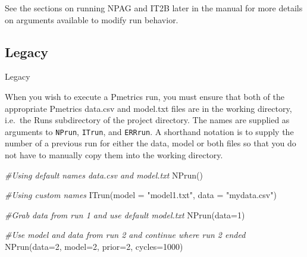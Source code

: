 \documentclass[
]{book}
\newenvironment{Shaded}{\begin{snugshade}}{\end{snugshade}}
\newcommand{\AttributeTok}[1]{\textcolor[rgb]{0.77,0.63,0.00}{#1}}
\newcommand{\CommentTok}[1]{\textcolor[rgb]{0.56,0.35,0.01}{\textit{#1}}}
\newcommand{\DecValTok}[1]{\textcolor[rgb]{0.00,0.00,0.81}{#1}}
\newcommand{\FunctionTok}[1]{\textcolor[rgb]{0.00,0.00,0.00}{#1}}
\newcommand{\NormalTok}[1]{#1}
\newcommand{\SpecialCharTok}[1]{\textcolor[rgb]{0.00,0.00,0.00}{#1}}
\newcommand{\StringTok}[1]{\textcolor[rgb]{0.31,0.60,0.02}{#1}}
\begin{document}
\begin{Shaded}
\end{Shaded}

See the sections on running NPAG and IT2B later in the manual for more details on arguments available to modify run behavior.

\hypertarget{legacy}{%
\subsection{Legacy}\label{legacy}}

{Legacy}

When you wish to execute a Pmetrics run, you must ensure that
both of the appropriate Pmetrics data.csv and model.txt files are in the working
directory, i.e.~the Runs subdirectory of the project directory. The names are supplied as arguments to \texttt{NPrun}, \texttt{ITrun}, and \texttt{ERRrun}. A shorthand notation is to supply the number of a previous run for either the data, model or both files so that you do not have to manually copy them into the working directory.

\begin{Shaded}
\begin{Highlighting}[]
\CommentTok{\#Using default names data.csv and model.txt}
\FunctionTok{NPrun}\NormalTok{()}

\CommentTok{\#Using custom names}
\FunctionTok{ITrun}\NormalTok{(}\AttributeTok{model =} \StringTok{"model1.txt"}\NormalTok{, }\AttributeTok{data =} \StringTok{"mydata.csv"}\NormalTok{)}

\CommentTok{\#Grab data from run 1 and use default model.txt}
\FunctionTok{NPrun}\NormalTok{(}\AttributeTok{data=}\DecValTok{1}\NormalTok{)}

\CommentTok{\#Use model and data from run 2 and continue where run 2 ended}
\FunctionTok{NPrun}\NormalTok{(}\AttributeTok{data=}\DecValTok{2}\NormalTok{, }\AttributeTok{model=}\DecValTok{2}\NormalTok{, }\AttributeTok{prior=}\DecValTok{2}\NormalTok{, }\AttributeTok{cycles=}\DecValTok{1000}\NormalTok{)}
\end{Highlighting}
\end{Shaded}
\end{document}
